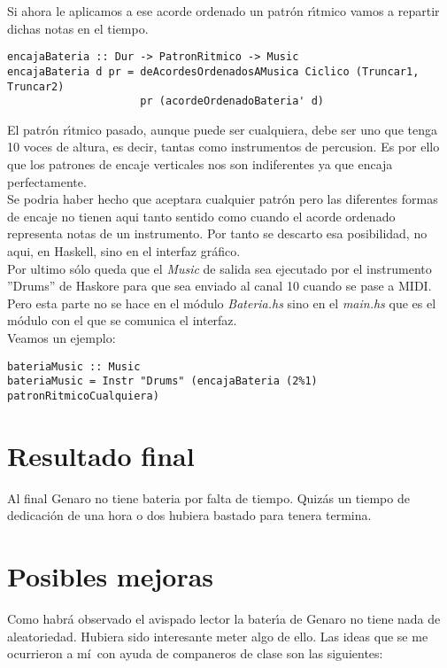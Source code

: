 Si ahora le aplicamos a ese acorde ordenado un patr\'on r\'\i tmico vamos a repartir
dichas notas en el tiempo.

\small
\begin{verbatim}
encajaBateria :: Dur -> PatronRitmico -> Music
encajaBateria d pr = deAcordesOrdenadosAMusica Ciclico (Truncar1, Truncar2) 
                     pr (acordeOrdenadoBateria' d)
\end{verbatim}
\normalsize

\indent El patr\'on r\'\i tmico pasado, aunque puede ser cualquiera, debe ser uno que tenga 
10 voces de altura, es decir, tantas como instrumentos de percusion. Es por
ello que los patrones de encaje verticales nos son indiferentes ya que encaja
perfectamente.\\
\indent Se podria haber hecho que aceptara cualquier patr\'on pero las diferentes formas
de encaje no tienen aqui tanto sentido como cuando el acorde ordenado representa
notas de un instrumento. Por tanto se descarto esa posibilidad, no aqui, en Haskell,
sino en el interfaz gr\'afico.\\
\indent Por ultimo s\'olo queda que el \emph{Music} de salida sea ejecutado por el instrumento
''Drums'' de Haskore para que sea enviado al canal 10 cuando se pase a MIDI.
Pero esta parte no se hace en el m\'odulo \emph{Bateria.hs} sino en el \emph{main.hs} que es
el m\'odulo con el que se comunica el interfaz.\\
\indent Veamos un ejemplo:

\small
\begin{verbatim}
bateriaMusic :: Music
bateriaMusic = Instr "Drums" (encajaBateria (2%1) patronRitmicoCualquiera)
\end{verbatim}
\normalsize

\section{Resultado final}
Al final Genaro no tiene bateria por falta de tiempo. Quiz\'as un tiempo
de dedicaci\'on de una hora o dos hubiera bastado para tenera termina.

\section{Posibles mejoras}
Como habr\'a observado el avispado lector la bater\'\i a de Genaro no tiene
nada de aleatoriedad. Hubiera sido interesante meter algo de ello. Las ideas
que se me ocurrieron a m\'i~con ayuda de companeros de clase son las siguientes:

